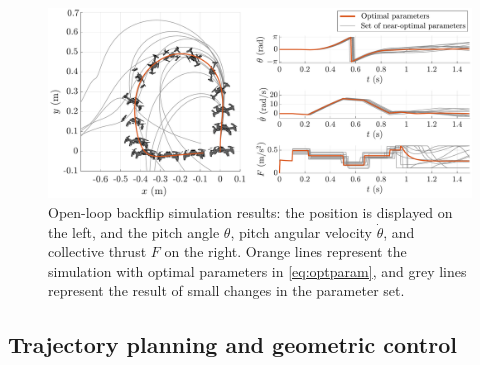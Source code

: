 \begin{figure}[!h]
\centering
\includegraphics[width=\linewidth]{Fig/opensimu2.pdf}
\caption{Open-loop backflip simulation results: the position is displayed on the left, and the pitch angle $\theta$, pitch angular velocity $\dot{\theta}$, and collective thrust $F$ on the right. Orange lines represent the simulation with optimal parameters in \eqref{eq:optparam}, and grey lines represent the result of small changes in the parameter set.}\label{fig:opensimu}
\end{figure}




\pagebreak
\subsection{Trajectory planning and geometric control}

